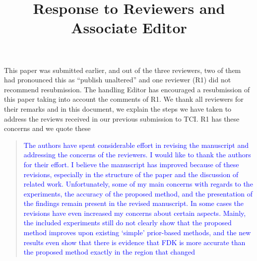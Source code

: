 \documentclass{article}
\title{Response to Reviewers and Associate Editor}
\begin{document}
\date{}
\maketitle

This paper was submitted earlier, and out of the three reviewers, two of them had pronounced this as ``publish unaltered'' and one reviewer (R1) did not recommend resubmission. The handling Editor has encouraged a resubmission of this paper taking into account the comments of R1.  We thank all reviewers for their remarks and in this document, we explain the steps we have taken to address the reviews received in our previous submission to TCI. R1 has these concerns and we quote these
\begin{quote}
  \textcolor{blue}{The authors have spent considerable effort in revising the
  manuscript and addressing the concerns of the reviewers. I would
  like to thank the authors for their effort. I believe the manuscript
  has improved because of these revisions, especially in the structure
  of the paper and the discussion of related work. Unfortunately, some
  of my main concerns with regards to the experiments, the accuracy of
  the proposed method, and the presentation of the findings remain
  present in the revised manuscript. In some cases the revisions have
  even increased my concerns about certain aspects. Mainly, the
  included experiments still do not clearly show that the proposed
  method improves upon existing ‘simple’ prior-based methods, and the
  new results even show that there is evidence that FDK is more
  accurate than the proposed method exactly in the region that changed}
  \end{quote}
\end{document}
